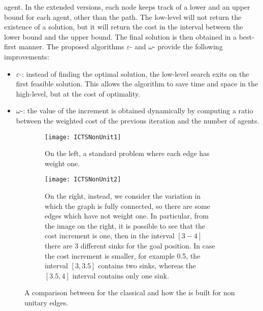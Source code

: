 agent. In the extended versions, each node keeps track of a lower and an upper
bound for each agent, other than the path. The low-level will not return the
existence of a solution, but it will return the cost in the interval between
the lower bound and the upper bound. The final solution is then obtained in a
best-first manner. \newline
The proposed algorithms $\varepsilon$- and $\omega$-
provide the following improvements:
\begin{itemize}
  \item $\varepsilon$-: instead of finding the optimal solution, the
    low-level search exits on the first feasible solution. This allows the
    algorithm to save time and space in the high-level, but at the cost of 
    optimality.
  \item $\omega$-: the value of the increment is obtained
    dynamically by computing a ratio between the weighted cost of the previous
    iteration and the number of agents.
\end{itemize}
\begin{figure}[htpb]
  \centering
  \begin{subfigure}[t]{0.49\linewidth}
    \centering
    \texttt{[image: ICTSNonUnit1]}
    \caption{On the left, a standard  problem where each edge has
      weight one.} 
  \end{subfigure}
  \hfill
  \begin{subfigure}[t]{0.49\linewidth}
    \centering
    \texttt{[image: ICTSNonUnit2]}
    \caption{On the right, instead, we consider the variation in which the
      graph is fully connected, so there are some edges which have not weight 
      one. In particular, from the image on the right, it is possible to see 
      that the cost increment is one, then in the interval $[3-4]$ there are 3 
      different sinks for the goal position. In case the cost increment is 
      smaller, for example 0.5, the interval $[3,3.5]$ contains two sinks, 
      whereas the $[3.5,4]$ interval contains only one sink.}
  \end{subfigure}
  \caption{A comparison between  for the classical  and
    how the  is built for non unitary edges.}
  \label{fig:eICTS}
\end{figure}
